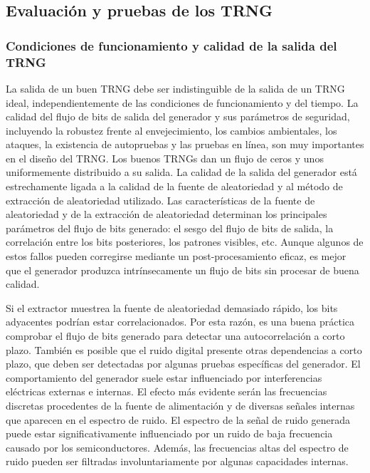 	
        \subsection{Evaluación y pruebas de los TRNG}
	
		    \subsubsection{Condiciones de funcionamiento y calidad de la salida del TRNG}
	
	            La salida de un buen TRNG debe ser indistinguible de la salida de un TRNG ideal, independientemente de las condiciones de funcionamiento y del tiempo. La calidad del flujo de bits de salida del generador y sus parámetros de seguridad, incluyendo la robustez frente al envejecimiento, los cambios ambientales, los ataques, la existencia de autopruebas y las pruebas en línea, son muy importantes en el diseño del TRNG. Los buenos TRNGs dan un flujo de ceros y unos uniformemente distribuido a su salida. La calidad de la salida del generador está estrechamente ligada a la calidad de la fuente de aleatoriedad y al método de extracción de aleatoriedad utilizado. Las características de la fuente de aleatoriedad y de la extracción de aleatoriedad determinan los principales parámetros del flujo de bits generado: el sesgo del flujo de bits de salida, la correlación entre los bits posteriores, los patrones visibles, etc. Aunque algunos de estos fallos pueden corregirse mediante un post-procesamiento eficaz, es mejor que el generador produzca intrínsecamente un flujo de bits sin procesar de buena calidad.
	
	            Si el extractor muestrea la fuente de aleatoriedad demasiado rápido, los bits adyacentes podrían estar correlacionados. Por esta razón, es una buena práctica comprobar el flujo de bits generado para detectar una autocorrelación a corto plazo. También es posible que el ruido digital presente otras dependencias a corto plazo, que deben ser detectadas por algunas pruebas específicas del generador. El comportamiento del generador suele estar influenciado por interferencias eléctricas externas e internas. El efecto más evidente serán las frecuencias discretas procedentes de la fuente de alimentación y de diversas señales internas que aparecen en el espectro de ruido. El espectro de la señal de ruido generada puede estar significativamente influenciado por un ruido de baja frecuencia causado por los semiconductores. Además, las frecuencias altas del espectro de ruido pueden ser filtradas involuntariamente por algunas capacidades internas.

